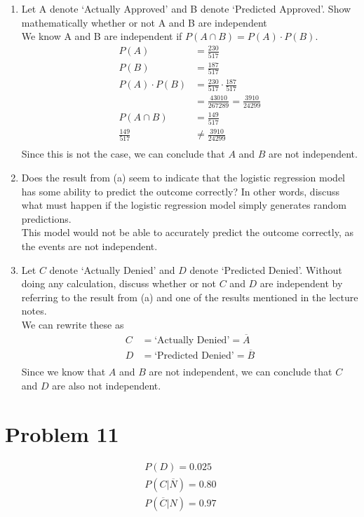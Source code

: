 \documentclass{article}
\begin{document}
\begin{enumerate}[label=\alph*)]
    \item Let A denote ‘Actually Approved’ and B denote ‘Predicted Approved’. Show
          mathematically whether or not A and B are independent \\
          We know A and B are independent if \(P(A \cap B) = P(A) \cdot P(B)\).
          \begin{align*}
              P(A)            & = \frac{230}{517}                           \\
              P(B)            & = \frac{187}{517}                           \\
              P(A) \cdot P(B) & = \frac{230}{517} \cdot \frac{187}{517}     \\
                              & = \frac{43010}{267289} = \frac{3910}{24299} \\
              P(A \cap B)     & = \frac{149}{517}                           \\
              \frac{149}{517} & \neq \frac{3910}{24299}                     \\
          \end{align*}
          Since this is not the case, we can conclude that \(A\) and \(B\) are not independent.
    \item Does the result from (a) seem to indicate that the logistic regression model has some
          ability to predict the outcome correctly? In other words, discuss what must happen if the
          logistic regression model simply generates random predictions. \\
          This model would not be able to accurately predict the outcome correctly, as the events are not independent.
    \item Let \(C\) denote ‘Actually Denied’ and \(D\) denote ‘Predicted Denied’. Without doing any
          calculation, discuss whether or not \(C\) and \(D\) are independent by referring to the result from (a)
          and one of the results mentioned in the lecture notes. \\
          We can rewrite these as
          \begin{align*}
              C & = \text{`Actually Denied'} = \overline{A}  \\
              D & = \text{`Predicted Denied'} = \overline{B} \\
          \end{align*}
          Since we know that \(A\) and \(B\) are not independent, we can conclude that \(C\) and \(D\) are also not independent.
\end{enumerate}

\pagebreak

\section*{Problem 11}
\begin{align*}
    P(D) = 0.025                    \\
    P(C \vert\overline{N}) = 0.80   \\
    P(\overline{C} \vert N) = 0.97\ \\
\end{align*}
\end{document}

